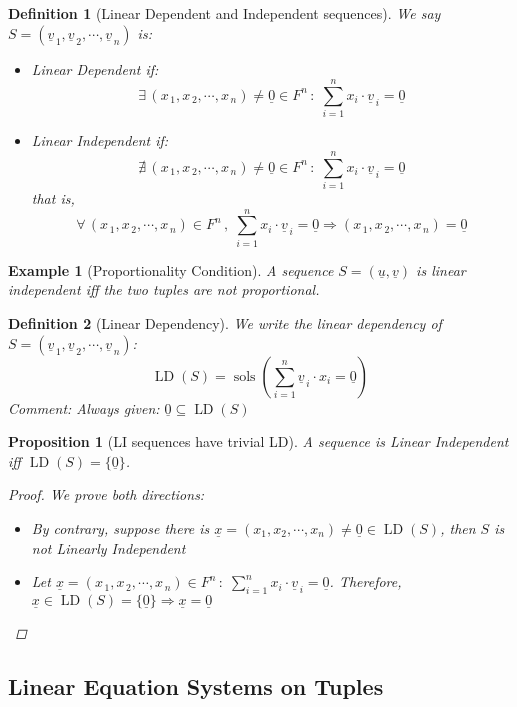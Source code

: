 \documentclass[12pt]{article}
\let\RA\Rightarrow
\let\LA\Leftarrow
\newcommand{\Forall}[1]{\forall\,{#1}\,,\;}
\newcommand{\Exist}[1]{\exists\,{#1}\,:\;}
\newcommand{\NExist}[1]{\nexists\,{#1}\,:\;}
\newcommand{\tuple}[1]{\underline{#1}}
\newcommand{\seq}[2]{\left({#1}_{\,1},{#1}_{\,2},\cdots,{#1}_{\,#2}\right)}
\newcommand{\seqt}[2]{\left(\tuple{#1}_{\,1},\tuple{#1}_{\,2},\cdots,\tuple{#1}_{\,#2}\right)}
\DeclareMathOperator{\sols}{sols}
\DeclareMathOperator{\LD}{LD}
\newtheorem{definition}{Definition}[subsection]
\newtheorem{proposition}{Proposition}[subsection]
\newtheorem{example}{Example}[subsection]
\begin{document}
\begin{definition}[Linear Dependent and Independent sequences]
  We say $S=\seqt{v}{n}$ is:
  \begin{itemize}
    \item [] Linear Dependent if: $$\Exist{\seq{x}{n}\neq\tuple{0} \in F^n}\sum_{i=1}^n  x_i\cdot \tuple{v}_{\,i}=\tuple{0}$$
    \item [] Linear Independent if: $$\NExist{\seq{x}{n}\neq\tuple{0} \in F^n}\sum_{i=1}^n  x_i\cdot \tuple{v}_{\,i}=\tuple{0}$$ that is, $$\Forall{\seq{x}{n}\in F^n}\sum_{i=1}^n  x_i\cdot \tuple{v}_{\,i}=\tuple{0}\RA \seq{x}{n}=\tuple{0}$$
  \end{itemize}
\end{definition}

\begin{example}[Proportionality Condition]
  A sequence $S=(\tuple{u},\tuple{v})$ is linear independent iff the two tuples are not proportional.
\end{example}

\begin{definition}[Linear Dependency]
  We write the linear dependency of $S=\seqt{v}{n}$: $$\LD(S)=\sols\left(\sum_{i=1}^n \tuple{v}_{\,i}\cdot x_i=\tuple{0}\right)$$
  Comment: Always given: $\tuple{0}\subseteq\LD(S)$
\end{definition}

\begin{proposition}[LI sequences have trivial LD]
  A sequence is Linear Independent iff $\LD(S)=\{\tuple{0}\}$.
  \begin{proof}
    We prove both directions:
    \begin{itemize}
      \item[$(\RA)$] By contrary, suppose there is $\tuple{x}=(x_1,x_2,\cdots,x_n)\neq\tuple{0}\in\LD(S)$, then $S$ is not Linearly Independent
      \item[$(\LA)$] Let $\tuple{x}=\seq{x}{n}\in F^n\,:\;\sum_{i=1}^n  x_i\cdot \tuple{v}_{\,i}=\tuple{0}$. Therefore, $\tuple{x}\in\LD(S)=\{\tuple{0}\}\RA \tuple{x}=\tuple{0}$
    \end{itemize}
  \end{proof}
\end{proposition}

\subsection{Linear Equation Systems on Tuples}
\end{document}
